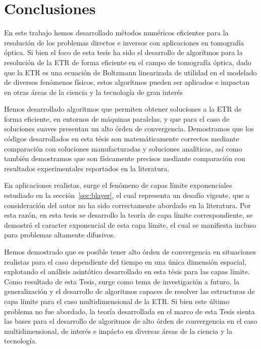 \pagestyle{fancy}
\chapter{Conclusiones}
\label{cap:conc}
\lhead{\thepage}
\vspace{0.01\textheight}
\pagebreak

\clearpage \pagebreak En este trabajo hemos desarrollado métodos numéricos eficientes 
para la resolución de los problemas directos e inversos con 
aplicaciones en tomografía óptica. 
Si bien el foco de esta tesis ha sido el desarrollo de algorítmos 
para la resolución de la ETR de forma eficiente en el campo 
de tomografía óptica, 
dado que la ETR es una ecuación de Boltzmann 
linearizada de utilidad en el modelado de diversos 
fenómenos físicos, estos algorítmos pueden ser aplicados e impactan 
en otras áreas de la ciencia y la tecnología de gran interés~\cite{Howell2010, Thynell1998,Duderstadt1979,Qin2015,Dymond1997,Chandrasekhar1960,Zhu2005,Zhu2010,Vassiliev2010,Bedford2019,Vassiliev2010,Bedford2019,Larsen2006, Sanchez1982, Anli2006,Mishchenko1999, Prasher2003}

 Hemos desarrollado algoritmos que permiten obtener soluciones 
 a la ETR de forma eficiente, en entornos de máquinas paralelas, 
 y que para el caso de soluciones suaves presentan un alto órden de convergencia. 
 Demostramos que los códigos desarrollados en esta tésis son matemáticamente 
 correctos mediante comparación con soluciones manufacturadas y soluciones 
 analíticas, así como también demostramos que son físicamente 
 precisos mediante comparación con resultados experimentales 
 reportados en la literatura.
 
 En aplicaciones realistas, surge el fenómeno de capas límite exponenciales 
 estudiado en la sección~\ref{sec:blayer}, el cual representa un desafío 
 vigente, que a consideración del autor no ha sido correctamente 
 abordado en la literatura. Por esta razón, en esta tesis 
 se desarrollo la teoría de capa límite correspondiente, se demostró 
 el caracter exponencial de esta capa límite, el cual se manifiesta 
 incluso para problemas altamente difusivos.
 
 Hemos demostrado que es posible 
 tener alto órden de convergencia en situaciones realistas para 
 el caso dependiente del tiempo en una única dimensión espacial, 
 explotando el análisis asintótico desarrollado en esta tésis para las capas límite. 
 Como resultado de esta Tesis, 
 surge como tema de investigación a futuro, la generalización y el desarrollo de algoritmos capaces 
 de resolver las estructuras de capa límite para el caso 
 multidimensional de la ETR. Si bien este último problema no fue abordado, 
 la teoría desarrollada en el marco de esta Tesis sienta las bases 
 para el desarrollo de algoritmos de alto órden de convergencia en el 
 caso multidimensional, de interés e impácto en diversas 
 áreas de la ciencia y la tecnología. 
 
